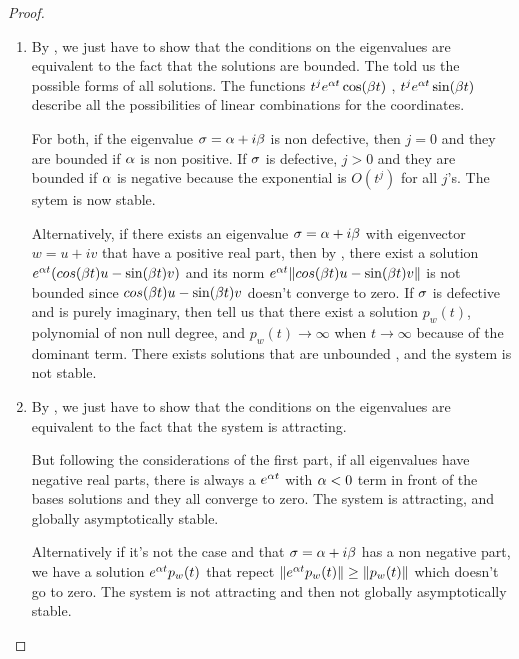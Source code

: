 \begin{proof} 
\quad\\
\begin{enumerate}
\item 
By , we just have to show that the conditions on the eigenvalues are equivalent to the fact that the solutions are bounded. The  told us the possible forms of all solutions. The functions $t^je^{\alpha t}\cos(\beta t)$ , $t^je^{\alpha t}\sin(\beta t)$ describe all the possibilities of linear combinations for the coordinates.

For both, if the eigenvalue $\sigma=\alpha+i\beta$ is non defective, then $j=0$ and they are bounded if $\alpha$ is non positive. If $\sigma$ is defective, $j>0$ and they are bounded if $\alpha$ is negative because the exponential is $O(t^j)$ for all $j$'s. The sytem is now stable.

Alternatively, if there exists an eigenvalue $\sigma=\alpha+i\beta$ with eigenvector $w=u+iv$ that have a positive real part, then by , there exist a solution $e^{\alpha t}(cos(\beta t)u-\sin(\beta t)v)$ and its norm $e^{\alpha t}\|cos(\beta t)u-\sin(\beta t)v\|$
is not bounded since $cos(\beta t)u-\sin(\beta t)v$ doesn't converge to zero. If $\sigma$ is defective and is purely imaginary, then  tell us that there exist a solution $p_w(t)$, polynomial of non null degree, and $p_w(t)\to\infty$ when $t\to\infty$ because of the dominant term. There exists solutions that are unbounded , and the system is not stable.

\item 
By , we just have to show that the conditions on the eigenvalues are equivalent to the fact that the system is attracting.

But following the considerations of the first part, if all eigenvalues have negative real parts, there is always a $e^{\alpha t}$ with $\alpha<0$ term in front of the bases solutions and they all converge to zero. The system is attracting, and globally asymptotically stable.

Alternatively if it's not the case and that $\sigma=\alpha+i\beta$ has a non negative part, we have a solution $e^{\alpha t}p_w(t)$ that repect $\|e^{\alpha t}p_w(t)\| \geq \|p_w(t)\|$ which doesn't go to zero. The system is not attracting and then not globally asymptotically stable.
\end{enumerate}
\end{proof}

